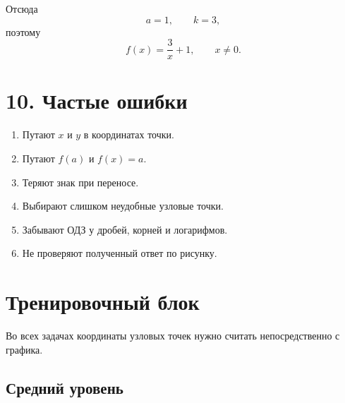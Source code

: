 \documentclass[a4paper,12pt]{article}
\newcommand{\sepLine}{\par\vspace{2mm}{\color{lightaccent}\rule{\linewidth}{0.8pt}}\vspace{2mm}}
\begin{document}
Отсюда
\[
a=1,
\qquad
k=3,
\]
поэтому
\[
\boxed{f(x)=\frac3x+1},
\qquad x\ne0.
\]

\sepLine

\section*{\textcolor{darkaccent}{10. Частые ошибки}}

\begin{enumerate}
  \item Путают $x$ и $y$ в координатах точки.
  \item Путают $f(a)$ и $f(x)=a$.
  \item Теряют знак при переносе.
  \item Выбирают слишком неудобные узловые точки.
  \item Забывают ОДЗ у дробей, корней и логарифмов.
  \item Не проверяют полученный ответ по рисунку.
\end{enumerate}

\clearpage
\section*{\textcolor{darkaccent}{Тренировочный блок}}

Во всех задачах координаты узловых точек нужно считать непосредственно с графика.

\subsection*{Средний уровень}
\end{document}
